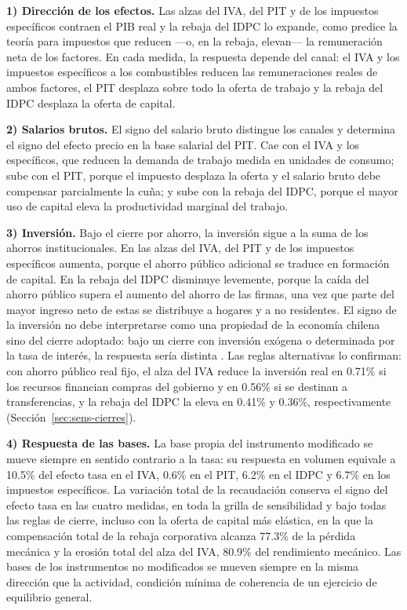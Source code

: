 \documentclass[11pt]{article}
\begin{document}
\textbf{1) Dirección de los efectos.} Las alzas del IVA, del PIT y de los impuestos específicos contraen el PIB real y la rebaja del IDPC lo expande, como predice la teoría para impuestos que reducen ---o, en la rebaja, elevan--- la remuneración neta de los factores. En cada medida, la respuesta depende del canal: el IVA y los impuestos específicos a los combustibles reducen las remuneraciones reales de ambos factores, el PIT desplaza sobre todo la oferta de trabajo y la rebaja del IDPC desplaza la oferta de capital.

\textbf{2) Salarios brutos.} El signo del salario bruto distingue los canales y determina el signo del efecto precio en la base salarial del PIT. Cae con el IVA y los específicos, que reducen la demanda de trabajo medida en unidades de consumo; sube con el PIT, porque el impuesto desplaza la oferta y el salario bruto debe compensar parcialmente la cuña; y sube con la rebaja del IDPC, porque el mayor uso de capital eleva la productividad marginal del trabajo.

\textbf{3) Inversión.} Bajo el cierre por ahorro, la inversión sigue a la suma de los ahorros institucionales. En las alzas del IVA, del PIT y de los impuestos específicos aumenta, porque el ahorro público adicional se traduce en formación de capital. En la rebaja del IDPC disminuye levemente, porque la caída del ahorro público supera el aumento del ahorro de las firmas, una vez que parte del mayor ingreso neto de estas se distribuye a hogares y a no residentes. El signo de la inversión no debe interpretarse como una propiedad de la economía chilena sino del cierre adoptado: bajo un cierre con inversión exógena o determinada por la tasa de interés, la respuesta sería distinta \cite{sen_1963,robinson_2006}. Las reglas alternativas lo confirman: con ahorro público real fijo, el alza del IVA reduce la inversión real en 0.71\% si los recursos financian compras del gobierno y en 0.56\% si se destinan a transferencias, y la rebaja del IDPC la eleva en 0.41\% y 0.36\%, respectivamente (Sección~\ref{sec:sens-cierres}).

\textbf{4) Respuesta de las bases.} La base propia del instrumento modificado se mueve siempre en sentido contrario a la tasa: su respuesta en volumen equivale a 10.5\% del efecto tasa en el IVA, 0.6\% en el PIT, 6.2\% en el IDPC y 6.7\% en los impuestos específicos. La variación total de la recaudación conserva el signo del efecto tasa en las cuatro medidas, en toda la grilla de sensibilidad y bajo todas las reglas de cierre, incluso con la oferta de capital más elástica, en la que la compensación total de la rebaja corporativa alcanza 77.3\% de la pérdida mecánica y la erosión total del alza del IVA, 80.9\% del rendimiento mecánico. Las bases de los instrumentos no modificados se mueven siempre en la misma dirección que la actividad, condición mínima de coherencia de un ejercicio de equilibrio general.
\end{document}
